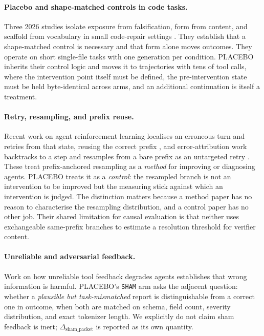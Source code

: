 \documentclass{article}
\begin{document}
\paragraph{Placebo and shape-matched controls in code tasks.}
Three 2026 studies isolate exposure from falsification, form from content, and
scaffold from vocabulary in small code-repair settings
\cite{iscan_falsificationnotexposure_2026,iscan_formnotcontent_2026,iscan_scaffoldnotvocabulary_2026}.
They establish that a shape-matched control is necessary and that form alone
moves outcomes. They operate on short single-file tasks with one generation per
condition. PLACEBO inherits their control logic and moves it to trajectories
with tens of tool calls, where the intervention point itself must be defined,
the pre-intervention state must be held byte-identical across arms, and an
additional continuation is itself a treatment.

\paragraph{Retry, resampling, and prefix reuse.}
Recent work on agent reinforcement learning localises an erroneous turn and
retries from that state, reusing the correct prefix
\cite{arl_pivotal_retry_2026}, and error-attribution work backtracks to a step
and resamples from a bare prefix as an untargeted retry
\cite{reflect_error_attribution_2026}. These treat prefix-anchored resampling
as a \emph{method} for improving or diagnosing agents. PLACEBO treats it as a
\emph{control}: the resampled branch is not an intervention to be improved but
the measuring stick against which an intervention is judged. The distinction
matters because a method paper has no reason to characterise the resampling
distribution, and a control paper has no other job. Their shared limitation for
causal evaluation is that neither uses exchangeable same-prefix branches to
estimate a resolution threshold for verifier content.

\paragraph{Unreliable and adversarial feedback.}
Work on how unreliable tool feedback degrades agents
\cite{unreliable_feedback_2026} establishes that wrong information is harmful.
PLACEBO's \texttt{SHAM} arm asks the adjacent question: whether a
\emph{plausible but task-mismatched} report is distinguishable from a correct
one in outcome, when both are matched on schema, field count, severity
distribution, and exact tokenizer length. We explicitly do not claim sham
feedback is inert; $\Delta_{\text{sham\_packet}}$ is reported as its own
quantity.
\end{document}
